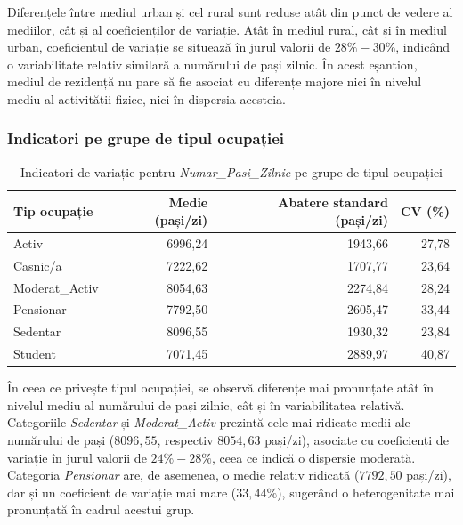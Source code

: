 \documentclass[12pt,a4paper]{report}
\begin{document}
Diferențele între mediul urban și cel rural sunt reduse atât din punct de vedere al mediilor, cât și al coeficienților de variație. Atât în mediul rural, cât și în mediul urban, coeficientul de variație se situează în jurul valorii de \(28\% - 30\%\), indicând o variabilitate relativ similară a numărului de pași zilnic. În acest eșantion, mediul de rezidență nu pare să fie asociat cu diferențe majore nici în nivelul mediu al activității fizice, nici în dispersia acesteia.

\subsubsection*{Indicatori pe grupe de tipul ocupației}

\begin{table}[h!]
    \centering
    \caption{Indicatori de variație pentru \textit{Numar\_Pasi\_Zilnic} pe grupe de tipul ocupației}
    \label{tab:ind-grupe-ocupatie}
    \begin{tabular}{l r r r}
        \hline
        \textbf{Tip ocupație} & \textbf{Medie (pași/zi)} & \textbf{Abatere standard (pași/zi)} & \textbf{CV (\%)} \\
        \hline
        Activ          & 6996{,}24 & 1943{,}66 & 27{,}78 \\
        Casnic/a       & 7222{,}62 & 1707{,}77 & 23{,}64 \\
        Moderat\_Activ & 8054{,}63 & 2274{,}84 & 28{,}24 \\
        Pensionar      & 7792{,}50 & 2605{,}47 & 33{,}44 \\
        Sedentar       & 8096{,}55 & 1930{,}32 & 23{,}84 \\
        Student        & 7071{,}45 & 2889{,}97 & 40{,}87 \\
        \hline
    \end{tabular}
\end{table}

În ceea ce privește tipul ocupației, se observă diferențe mai pronunțate atât în nivelul mediu al numărului de pași zilnic, cât și în variabilitatea relativă. Categoriile \textit{Sedentar} și \textit{Moderat\_Activ} prezintă cele mai ridicate medii ale numărului de pași (\(8096{,}55\), respectiv \(8054{,}63\) pași/zi), asociate cu coeficienți de variație în jurul valorii de \(24\% - 28\%\), ceea ce indică o dispersie moderată. Categoria \textit{Pensionar} are, de asemenea, o medie relativ ridicată (\(7792{,}50\) pași/zi), dar și un coeficient de variație mai mare (\(33{,}44\%\)), sugerând o heterogenitate mai pronunțată în cadrul acestui grup.
\end{document}
